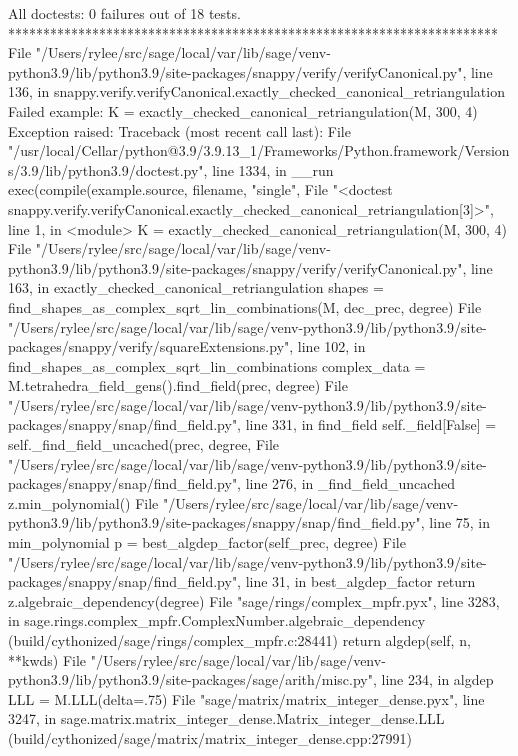All doctests:
   0 failures out of 18 tests.
**********************************************************************
File "/Users/rylee/src/sage/local/var/lib/sage/venv-python3.9/lib/python3.9/site-packages/snappy/verify/verifyCanonical.py", line 136, in snappy.verify.verifyCanonical.exactly_checked_canonical_retriangulation
Failed example:
    K = exactly_checked_canonical_retriangulation(M, 300, 4)
Exception raised:
    Traceback (most recent call last):
      File "/usr/local/Cellar/python@3.9/3.9.13_1/Frameworks/Python.framework/Versions/3.9/lib/python3.9/doctest.py", line 1334, in __run
        exec(compile(example.source, filename, "single",
      File "<doctest snappy.verify.verifyCanonical.exactly_checked_canonical_retriangulation[3]>", line 1, in <module>
        K = exactly_checked_canonical_retriangulation(M, 300, 4)
      File "/Users/rylee/src/sage/local/var/lib/sage/venv-python3.9/lib/python3.9/site-packages/snappy/verify/verifyCanonical.py", line 163, in exactly_checked_canonical_retriangulation
        shapes = find_shapes_as_complex_sqrt_lin_combinations(M, dec_prec, degree)
      File "/Users/rylee/src/sage/local/var/lib/sage/venv-python3.9/lib/python3.9/site-packages/snappy/verify/squareExtensions.py", line 102, in find_shapes_as_complex_sqrt_lin_combinations
        complex_data = M.tetrahedra_field_gens().find_field(prec, degree)
      File "/Users/rylee/src/sage/local/var/lib/sage/venv-python3.9/lib/python3.9/site-packages/snappy/snap/find_field.py", line 331, in find_field
        self._field[False] = self._find_field_uncached(prec, degree,
      File "/Users/rylee/src/sage/local/var/lib/sage/venv-python3.9/lib/python3.9/site-packages/snappy/snap/find_field.py", line 276, in _find_field_uncached
        z.min_polynomial()
      File "/Users/rylee/src/sage/local/var/lib/sage/venv-python3.9/lib/python3.9/site-packages/snappy/snap/find_field.py", line 75, in min_polynomial
        p = best_algdep_factor(self_prec, degree)
      File "/Users/rylee/src/sage/local/var/lib/sage/venv-python3.9/lib/python3.9/site-packages/snappy/snap/find_field.py", line 31, in best_algdep_factor
        return z.algebraic_dependency(degree)
      File "sage/rings/complex_mpfr.pyx", line 3283, in sage.rings.complex_mpfr.ComplexNumber.algebraic_dependency (build/cythonized/sage/rings/complex_mpfr.c:28441)
        return algdep(self, n, **kwds)
      File "/Users/rylee/src/sage/local/var/lib/sage/venv-python3.9/lib/python3.9/site-packages/sage/arith/misc.py", line 234, in algdep
        LLL = M.LLL(delta=.75)
      File "sage/matrix/matrix_integer_dense.pyx", line 3247, in sage.matrix.matrix_integer_dense.Matrix_integer_dense.LLL (build/cythonized/sage/matrix/matrix_integer_dense.cpp:27991)
